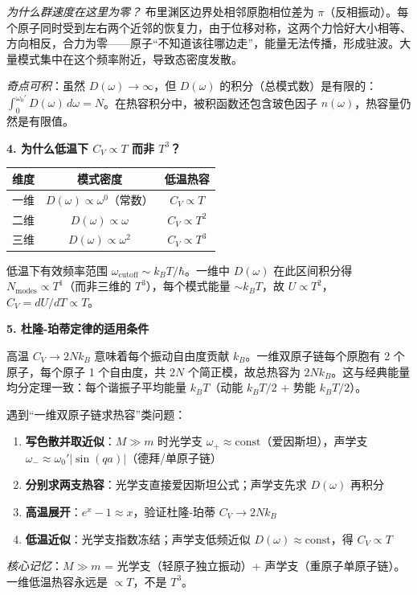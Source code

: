 \begin{insightbox}[物理图像与概念深化]
\textit{为什么群速度在这里为零？} 布里渊区边界处相邻原胞相位差为 $\pi$（反相振动）。每个原子同时受到左右两个近邻的恢复力，由于位移对称，这两个力恰好大小相等、方向相反，合力为零——原子``不知道该往哪边走''，能量无法传播，形成驻波。大量模式集中在这个频率附近，导致态密度发散。

\textit{奇点可积}：虽然 $D(\omega)\to\infty$，但 $D(\omega)$ 的积分（总模式数）是有限的：$\int_0^{\omega_0'}D(\omega)\,d\omega=N$。在热容积分中，被积函数还包含玻色因子 $n(\omega)$，热容量仍然是有限值。

\textbf{4. 为什么低温下 $C_V\propto T$ 而非 $T^3$？}

\begin{center}
\begin{tabular}{ccc}
\toprule
维度 & 模式密度 & 低温热容 \\
\midrule
一维 & $D(\omega)\propto\omega^0$（常数） & $C_V\propto T$ \\
二维 & $D(\omega)\propto\omega$ & $C_V\propto T^2$ \\
三维 & $D(\omega)\propto\omega^2$ & $C_V\propto T^3$ \\
\bottomrule
\end{tabular}
\end{center}

低温下有效频率范围 $\omega_{\text{cutoff}}\sim k_BT/\hbar$。一维中 $D(\omega)$ 在此区间积分得 $N_{\text{modes}}\propto T^1$（而非三维的 $T^3$），每个模式能量 $\sim k_BT$，故 $U\propto T^2$，$C_V=dU/dT\propto T$。

\textbf{5. 杜隆-珀蒂定律的适用条件}

高温 $C_V\to2Nk_B$ 意味着每个振动自由度贡献 $k_B$。一维双原子链每个原胞有 2 个原子，每个原子 1 个自由度，共 $2N$ 个简正模，故总热容为 $2Nk_B$。这与经典能量均分定理一致：每个谐振子平均能量 $k_BT$（动能 $k_BT/2$ + 势能 $k_BT/2$）。
\end{insightbox}

\begin{thinkbox}
遇到``一维双原子链求热容''类问题：
\begin{enumerate}
    \item \textbf{写色散并取近似}：$M\gg m$ 时光学支 $\omega_+\approx\text{const}$（爱因斯坦），声学支 $\omega_-\approx\omega_0'|\sin(qa)|$（德拜/单原子链）
    \item \textbf{分别求两支热容}：光学支直接爱因斯坦公式；声学支先求 $D(\omega)$ 再积分
    \item \textbf{高温展开}：$e^x-1\approx x$，验证杜隆-珀蒂 $C_V\to2Nk_B$
    \item \textbf{低温近似}：光学支指数冻结；声学支低频近似 $D(\omega)\approx\text{const}$，得 $C_V\propto T$
\end{enumerate}
\textit{核心记忆}：$M\gg m$ = 光学支（轻原子独立振动）+ 声学支（重原子单原子链）。一维低温热容永远是 $\propto T$，不是 $T^3$。
\end{thinkbox}
